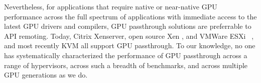 Nevertheless, for applications that require native or near-native GPU performance across the
full spectrum of applications with immediate access to the latest GPU drivers
and compilers, GPU passthrough solutions are preferrable to API remoting.  Today, Citrix Xenserver, open source Xen \cite{Yang:2012}, and VMWare ESXi ~\cite{Dowty2009}, and most recently KVM all support GPU passthrough.  To our knowledge, no one has systematically characterized the performance of GPU passthrough across a range of hypervisors, across such a breadth of benchmarks, and across multiple GPU generations as we do.  







